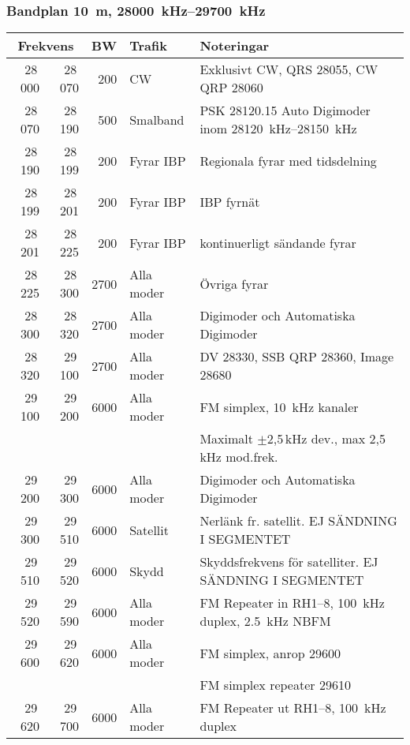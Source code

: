\subsubsection{Bandplan \SI{10}{\metre}, \SIrange{28000}{29700}{\kilo\hertz}}
\begin{tabular}{rrrll}
\multicolumn{2}{c}{\textbf{Frekvens}} & \textbf{BW} & \textbf{Trafik} & \textbf{Noteringar} \\ \hline

28\,000 & 28\,070 & 200  & CW         & Exklusivt CW, QRS \num{28055}, CW QRP \num{28060}                  \\ \hline
28\,070 & 28\,190 & 500  & Smalband   & PSK \num{28120,15} Auto Digimoder inom \SIrange{28120}{28150}{\kilo\hertz} \\ \hline
28\,190 & 28\,199 & 200  & Fyrar IBP  & Regionala fyrar med tidsdelning                                    \\ \hline
28\,199 & 28\,201 & 200  & Fyrar IBP  & IBP fyrnät                                                         \\ \hline
28\,201 & 28\,225 & 200  & Fyrar IBP  & kontinuerligt sändande fyrar                                       \\ \hline
28\,225 & 28\,300 & 2700 & Alla moder & Övriga fyrar                                                       \\ \hline
28\,300 & 28\,320 & 2700 & Alla moder & Digimoder och Automatiska Digimoder                                \\ \hline
28\,320 & 29\,100 & 2700 & Alla moder & DV \num{28330}, SSB QRP \num{28360}, Image \num{28680}{}           \\
29\,100 & 29\,200 & 6000 & Alla moder & FM simplex, \SI{10}{\kilo\hertz} kanaler                                   \\
        &         &      &            & Maximalt $\pm$2,5\,kHz dev., max 2,5\,kHz mod.frek.                \\ \hline
29\,200 & 29\,300 & 6000 & Alla moder & Digimoder och Automatiska Digimoder                                \\ \hline
29\,300 & 29\,510 & 6000 & Satellit   & Nerlänk fr. satellit. EJ SÄNDNING I SEGMENTET                      \\ \hline
29\,510 & 29\,520 & 6000 & Skydd      & Skyddsfrekvens för satelliter. EJ SÄNDNING I SEGMENTET             \\ \hline
29\,520 & 29\,590 & 6000 & Alla moder & FM Repeater in RH1--8, \SI{100}{\kilo\hertz} duplex, \SI{2,5}{\kilo\hertz} NBFM    \\ \hline
29\,600 & 29\,620 & 6000 & Alla moder & FM simplex, anrop \num{29600}                                      \\
        &         &      &            & FM simplex repeater \num{29610}                                    \\ \hline
29\,620 & 29\,700 & 6000 & Alla moder & FM Repeater ut RH1--8, \SI{100}{\kilo\hertz} duplex                       \\ \hline
\end{tabular}
\newpage

